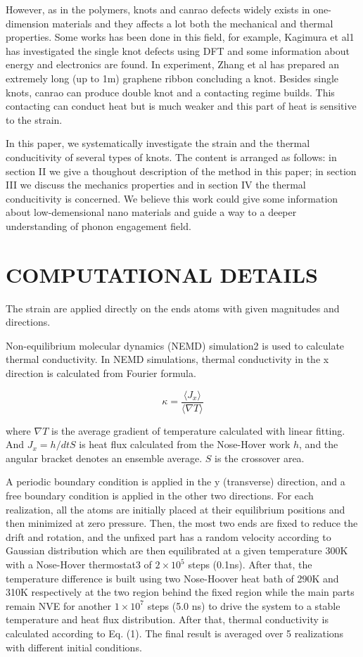 \documentclass[%
 reprint,
 amsmath,amssymb,
 aps,
prb,
]{revtex4-1}
\begin{document}
However, as in the polymers, knots and canrao defects widely exists in one-dimension materials and they affects a lot both the mechanical and thermal properties. Some works has been done in this field, for example, Kagimura et al1 has investigated the single knot defects using DFT and some information about energy and electronics are found. In experiment, Zhang et al has prepared an extremely long (up to 1m) graphene ribbon concluding a knot. Besides single knots, canrao can produce double knot and a contacting regime builds. This contacting can conduct heat but is much weaker and this part of heat is sensitive to the strain.

In this paper, we systematically investigate the strain and the thermal conducitivity of several types of knots. The content is arranged as follows: in section II we give a thoughout description of the method in this paper; in section III we discuss the mechanics properties and in section IV the thermal conducitivity is concerned. We believe this work could give some information about low-demensional nano materials and guide a way to a deeper understanding of phonon engagement field.

\section{COMPUTATIONAL DETAILS}

The strain are applied directly on the ends atoms with given magnitudes and directions.

Non-equilibrium molecular dynamics (NEMD) simulation2 is used to calculate thermal conductivity. In NEMD simulations, thermal conductivity in the x direction is calculated from Fourier formula.

\begin{equation}
  \kappa = \frac{\langle J_x\rangle}{\langle \nabla T\rangle}
\end{equation}

where $\nabla T$ is the average gradient of temperature calculated with linear fitting. And $J_x=h/dt S$ is heat flux calculated from the Nose-Hover work $h$, and the angular bracket denotes an ensemble average. $S$ is the crossover area.

A periodic boundary condition is applied in the y (transverse) direction, and a free boundary condition is applied in the other two directions. For each realization, all the atoms are initially placed at their equilibrium positions and then minimized at zero pressure. Then, the most two ends are fixed to reduce the drift and rotation, and the unfixed part has a random velocity according to Gaussian distribution which are then equilibrated at a given temperature 300K with a Nose-Hover thermostat3 of $2 \times10^5$ steps (0.1ns). After that, the temperature difference is built using two Nose-Hoover heat bath of 290K and 310K respectively at the two region behind the fixed region while the main parts remain NVE for another $1 \times10^7$ steps (5.0 ns) to drive the system to a stable temperature and heat flux distribution. After that, thermal conductivity is calculated according to Eq. (1). The final result is averaged over 5 realizations with different initial conditions.
\end{document}
